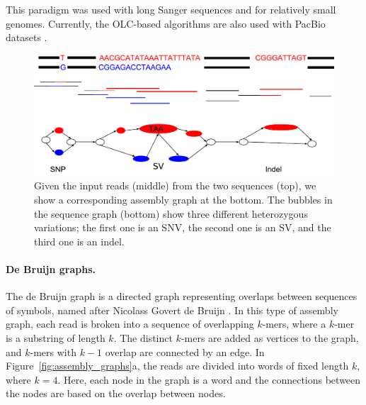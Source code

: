 This paradigm was used with long Sanger sequences and for relatively small
genomes. Currently, the OLC-based algorithms are also used with PacBio datasets \citep{grohme2018genome}. 

\begin{figure}[t!]\centering
\includegraphics[width=\columnwidth]{ex_sv.pdf}
\caption{Given the input reads (middle) from the two sequences (top), we show a corresponding assembly graph at the bottom.
The bubbles in the sequence graph (bottom) show three different heterozygous variations; the first one is an SNV, the second one is an SV, and the third one is an indel. }
\label{fig:ex_sv}
\end{figure}

\paragraph{De Bruijn graphs.}
The de Bruijn graph is a directed graph representing overlaps
between sequences of symbols, named after Nicolass Govert de Bruijn \citep{todd1933combinatorial}. 
In this type of assembly graph, each read is broken into a sequence of overlapping $k$-mers, where a $k$-mer is a substring of length $k$. The distinct
$k$-mers are added as vertices to the graph, and $k$-mers with $k-1$ overlap are connected by an edge.
In Figure~\ref{fig:assembly_graphs}a, the reads are divided into words of fixed length $k$, where $k=4$. Here,
each node in the graph is a word and the connections between the nodes are based on the overlap between nodes.


